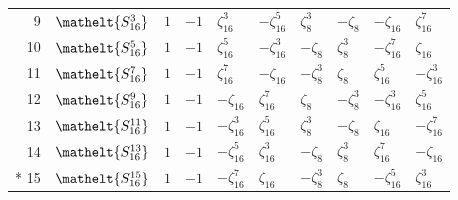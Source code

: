 \documentclass[10pt,a4paper]{article}
\numberwithin{equation}{section}
\newcommand{\eltfont}[1]{{\let\sigma\eltsigma\mathelt{#1}}}
\newcommand{\cls}[1]{\eltfont{#1}}
\newcommand{\rootunity}[1]{\zeta_{#1}}
\begin{document}
{\begin{longtable}{@{}rlllllllll@{}}
9 & $\cls{S_{16}^{3}}$ & $1$ & $-1$ & $\rootunity{16}^{3}$ & $-\rootunity{16}^{5}$ & $\rootunity{8}^{3}$ & $-\rootunity{8}$ & $-\rootunity{16}$ & $\rootunity{16}^{7}$\\
10 & $\cls{S_{16}^{5}}$ & $1$ & $-1$ & $\rootunity{16}^{5}$ & $-\rootunity{16}^{3}$ & $-\rootunity{8}$ & $\rootunity{8}^{3}$ & $-\rootunity{16}^{7}$ & $\rootunity{16}$\\
11 & $\cls{S_{16}^{7}}$ & $1$ & $-1$ & $\rootunity{16}^{7}$ & $-\rootunity{16}$ & $-\rootunity{8}^{3}$ & $\rootunity{8}$ & $\rootunity{16}^{5}$ & $-\rootunity{16}^{3}$\\
12 & $\cls{S_{16}^{9}}$ & $1$ & $-1$ & $-\rootunity{16}$ & $\rootunity{16}^{7}$ & $\rootunity{8}$ & $-\rootunity{8}^{3}$ & $-\rootunity{16}^{3}$ & $\rootunity{16}^{5}$\\
13 & $\cls{S_{16}^{11}}$ & $1$ & $-1$ & $-\rootunity{16}^{3}$ & $\rootunity{16}^{5}$ & $\rootunity{8}^{3}$ & $-\rootunity{8}$ & $\rootunity{16}$ & $-\rootunity{16}^{7}$\\
14 & $\cls{S_{16}^{13}}$ & $1$ & $-1$ & $-\rootunity{16}^{5}$ & $\rootunity{16}^{3}$ & $-\rootunity{8}$ & $\rootunity{8}^{3}$ & $\rootunity{16}^{7}$ & $-\rootunity{16}$\\*
15 & $\cls{S_{16}^{15}}$ & $1$ & $-1$ & $-\rootunity{16}^{7}$ & $\rootunity{16}$ & $-\rootunity{8}^{3}$ & $\rootunity{8}$ & $-\rootunity{16}^{5}$ & $\rootunity{16}^{3}$\\
\bottomrule\end{longtable}}
\end{document}
